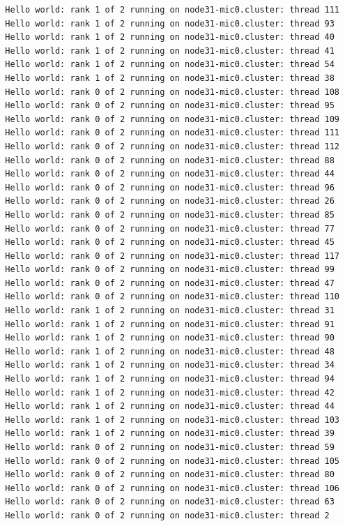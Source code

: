 \documentclass[pscyr,10pt]{hedlab}
\begin{document}
\begin{lstlisting}
  Hello world: rank 1 of 2 running on node31-mic0.cluster: thread 111
  Hello world: rank 1 of 2 running on node31-mic0.cluster: thread 93
  Hello world: rank 1 of 2 running on node31-mic0.cluster: thread 40
  Hello world: rank 1 of 2 running on node31-mic0.cluster: thread 41
  Hello world: rank 1 of 2 running on node31-mic0.cluster: thread 54
  Hello world: rank 1 of 2 running on node31-mic0.cluster: thread 38
  Hello world: rank 0 of 2 running on node31-mic0.cluster: thread 108
  Hello world: rank 0 of 2 running on node31-mic0.cluster: thread 95
  Hello world: rank 0 of 2 running on node31-mic0.cluster: thread 109
  Hello world: rank 0 of 2 running on node31-mic0.cluster: thread 111
  Hello world: rank 0 of 2 running on node31-mic0.cluster: thread 112
  Hello world: rank 0 of 2 running on node31-mic0.cluster: thread 88
  Hello world: rank 0 of 2 running on node31-mic0.cluster: thread 44
  Hello world: rank 0 of 2 running on node31-mic0.cluster: thread 96
  Hello world: rank 0 of 2 running on node31-mic0.cluster: thread 26
  Hello world: rank 0 of 2 running on node31-mic0.cluster: thread 85
  Hello world: rank 0 of 2 running on node31-mic0.cluster: thread 77
  Hello world: rank 0 of 2 running on node31-mic0.cluster: thread 45
  Hello world: rank 0 of 2 running on node31-mic0.cluster: thread 117
  Hello world: rank 0 of 2 running on node31-mic0.cluster: thread 99
  Hello world: rank 0 of 2 running on node31-mic0.cluster: thread 47
  Hello world: rank 0 of 2 running on node31-mic0.cluster: thread 110
  Hello world: rank 1 of 2 running on node31-mic0.cluster: thread 31
  Hello world: rank 1 of 2 running on node31-mic0.cluster: thread 91
  Hello world: rank 1 of 2 running on node31-mic0.cluster: thread 90
  Hello world: rank 1 of 2 running on node31-mic0.cluster: thread 48
  Hello world: rank 1 of 2 running on node31-mic0.cluster: thread 34
  Hello world: rank 1 of 2 running on node31-mic0.cluster: thread 94
  Hello world: rank 1 of 2 running on node31-mic0.cluster: thread 42
  Hello world: rank 1 of 2 running on node31-mic0.cluster: thread 44
  Hello world: rank 1 of 2 running on node31-mic0.cluster: thread 103
  Hello world: rank 1 of 2 running on node31-mic0.cluster: thread 39
  Hello world: rank 0 of 2 running on node31-mic0.cluster: thread 59
  Hello world: rank 0 of 2 running on node31-mic0.cluster: thread 105
  Hello world: rank 0 of 2 running on node31-mic0.cluster: thread 80
  Hello world: rank 0 of 2 running on node31-mic0.cluster: thread 106
  Hello world: rank 0 of 2 running on node31-mic0.cluster: thread 63
  Hello world: rank 0 of 2 running on node31-mic0.cluster: thread 2

\end{lstlisting}
\end{document}

